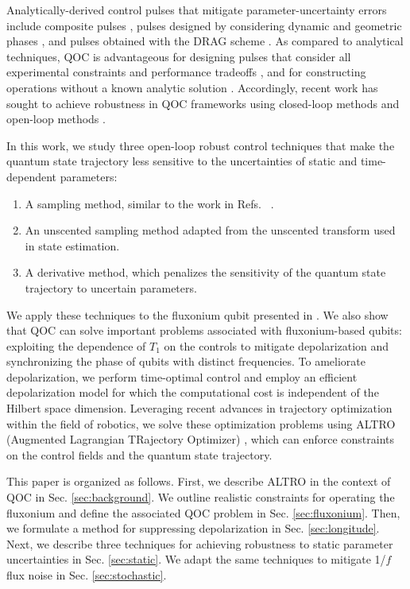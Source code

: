 Analytically-derived control pulses that mitigate parameter-uncertainty
errors include composite pulses \cite{cummins2000use, cummins2003tackling,
  kupce1995stretched, merrill2014progress},
pulses designed by considering dynamic and geometric phases
\cite{han2020experimental, xu2020nonadiabatic}, and
pulses obtained with the DRAG scheme \cite{motzoi2009simple}.
As compared to analytical techniques, QOC is advantageous for
designing pulses that consider all experimental constraints and
performance tradeoffs
\cite{leung2017speedup},
and for constructing operations without a known analytic solution
\cite{chakram2020multimode, heeres2017implementing}.
Accordingly, recent work has sought to achieve robustness in QOC
frameworks using closed-loop methods
\cite{egger2014adaptive, feng2018gradient,
  li2017hybrid, wittler2020integrated}
and open-loop methods
\cite{ball2020software, carvalho2020error, allen2019robust, reinhold2019controlling,
  rembold2020introduction, kosut2013robust, niu2019universal, khaneja2005optimal}.

In this work, we study three open-loop robust control techniques that
make the quantum state trajectory less sensitive to the uncertainties
of static and time-dependent parameters:
\begin{enumerate}
\item A sampling method, similar to the work in Refs.~
  \cite{allen2019robust, khaneja2005optimal, reinhold2019controlling, rembold2020introduction}.
\item An unscented sampling method \cite{howell2020direct, lee2013sigma, thangavel2020robust}
  adapted from the unscented transform \cite{julier2004unscented,
    uhlmann1995dynamic} used in state estimation.
  \item A derivative method, which penalizes the sensitivity of the quantum state trajectory
    to uncertain parameters.
\end{enumerate}
We apply these techniques to the fluxonium qubit presented in \cite{zhang2020universal}.
We also show that QOC can solve important problems associated with
fluxonium-based qubits: exploiting the dependence of $T_{1}$ on the controls
to mitigate depolarization
and synchronizing the phase of qubits with distinct frequencies.
To ameliorate depolarization,
we perform time-optimal control and
employ an efficient depolarization model
for which the computational cost is independent of the
Hilbert space dimension.
Leveraging recent advances in trajectory optimization within the field of robotics, we
solve these optimization problems using ALTRO (Augmented Lagrangian TRajectory Optimizer)
\cite{howell2019altro}, which can enforce constraints on
the control fields and the quantum state trajectory.

This paper is organized as follows.
First, we describe ALTRO in the context of QOC
in Sec. \ref{sec:background}.
We outline realistic constraints for operating the fluxonium and
define the associated QOC problem in Sec. \ref{sec:fluxonium}.
Then, we formulate a method for suppressing depolarization
in Sec. \ref{sec:longitude}. Next, we describe three techniques for achieving
robustness to static parameter uncertainties in Sec. \ref{sec:static}. We
adapt the same techniques to mitigate 1/$f$ flux noise
in Sec. \ref{sec:stochastic}.
